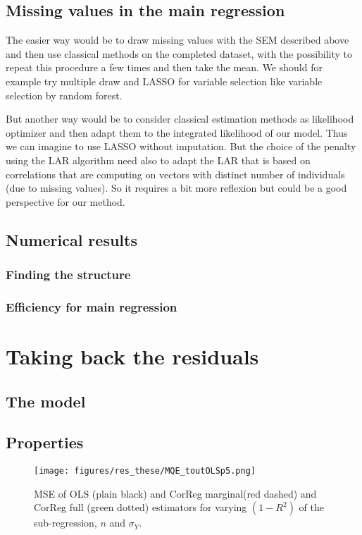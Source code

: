 \documentclass[11pt,a4paper]{report}
\begin{document}
%	
					
			
			
	\section{Missing values in the main regression}
		The easier way would be to draw missing values with the SEM described above and then use classical methods on the completed dataset, with the possibility to repeat this procedure a few times and then take the mean. We should for example try multiple draw and LASSO for variable selection like variable selection by random forest.
		
		But another way would be to consider classical estimation methods as likelihood optimizer and then adapt them to the integrated likelihood of our model. Thus we can imagine to use LASSO without imputation. But the choice of the penalty using the LAR algorithm need also to adapt the LAR that is based on correlations that are computing on vectors with distinct number of individuals (due to missing values). So it requires a bit more reflexion but could be a good perspective for our method.
	\section{Numerical results}
		\subsection{Finding the structure}
		\subsection{Efficiency for main regression}
\chapter{Taking back the residuals}
	\section{The model}
	\section{Properties}
\begin{figure}[h!]
	\texttt{[image: figures/res\_these/MQE\_toutOLSp5.png]}\label{MQE2}
	\caption{MSE of OLS (plain black) and CorReg marginal(red dashed) and CorReg full (green dotted) estimators for varying $(1-R^2)$ of the sub-regression, $n$ and $\sigma_Y$.}
\end{figure}	
	
\end{document}
